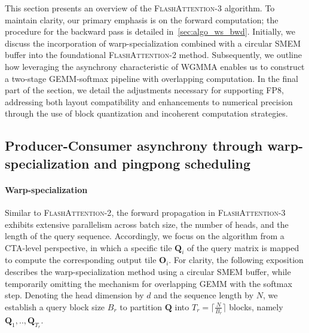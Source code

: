 \begin{enumerate}
This section presents an overview of the \textsc{FlashAttention-3} algorithm. To maintain clarity, our primary emphasis is on the forward computation; the procedure for the backward pass is detailed in~\cref{sec:algo_ws_bwd}. Initially, we discuss the incorporation of warp-specialization combined with a circular SMEM buffer into the foundational \textsc{FlashAttention-2} method. Subsequently, we outline how leveraging the asynchrony characteristic of WGMMA enables us to construct a two-stage GEMM-softmax pipeline with overlapping computation. In the final part of the section, we detail the adjustments necessary for supporting FP8, addressing both layout compatibility and enhancements to numerical precision through the use of block quantization and incoherent computation strategies.

\subsection{Producer-Consumer asynchrony through warp-specialization and pingpong scheduling}
\label{sec:algo_ws}

\paragraph{Warp-specialization}
Similar to \textsc{FlashAttention-2}, the forward propagation in \textsc{FlashAttention-3} exhibits extensive parallelism across batch size, the number of heads, and the length of the query sequence. Accordingly, we focus on the algorithm from a CTA-level perspective, in which a specific tile $\mathbf{Q}_i$ of the query matrix is mapped to compute the corresponding output tile $\mathbf{O}_i$. For clarity, the following exposition describes the warp-specialization method using a circular SMEM buffer, while temporarily omitting the mechanism for overlapping GEMM with the softmax step. Denoting the head dimension by $d$ and the sequence length by $N$, we establish a query block size $B_r$ to partition $\mathbf{Q}$ into $T_r = \lceil \frac{N}{B_r} \rceil$ blocks, namely $\mathbf{Q}_1, .., \mathbf{Q}_{T_r}$.


\end{enumerate}
